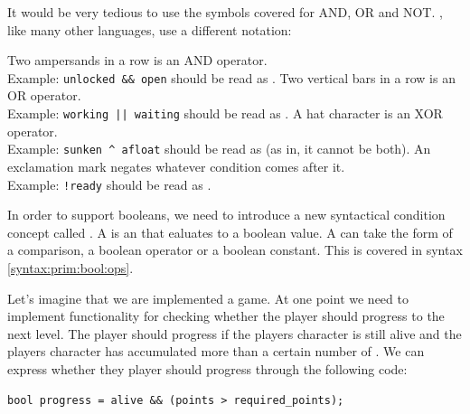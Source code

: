 It would be very tedious to use the symbols covered for AND, OR and NOT. \csharp, like many other languages, use a different notation:
\begin{itemize}
   Two ampersands in a row is an  AND operator. \\
    Example: \texttt{unlocked \&\& open} should be read as .
   Two vertical bars in a row is an  OR operator. \\
    Example: \texttt{working || waiting} should be read as .
   A hat character is an  XOR operator. \\
    Example: \texttt{sunken \textasciicircum\ afloat} should be read as  (as in, it cannot be both).
   An exclamation mark negates whatever condition comes after it. \\
    Example: \texttt{!ready} should be read as .
\end{itemize}

In order to support booleans, we need to introduce a new syntactical condition concept called . A  is an  that ealuates to a boolean value. A  can take the form of a comparison, a boolean operator or a boolean constant. This is covered in syntax \ref{syntax:prim:bool:ops}.

\begin{syntaxfloat}
  
  \caption{Expressions of boolean operators}
  \label{syntax:prim:bool:ops}
\end{syntaxfloat}

Let's imagine that we are implemented a game. At one point we need to implement functionality for checking whether the player should progress to the next level. The player should progress if the players character is still alive and the players character has accumulated more than a certain number of . We can express whether they player should progress through the following code:

\begin{verbatim}
bool progress = alive && (points > required_points);
\end{verbatim}

